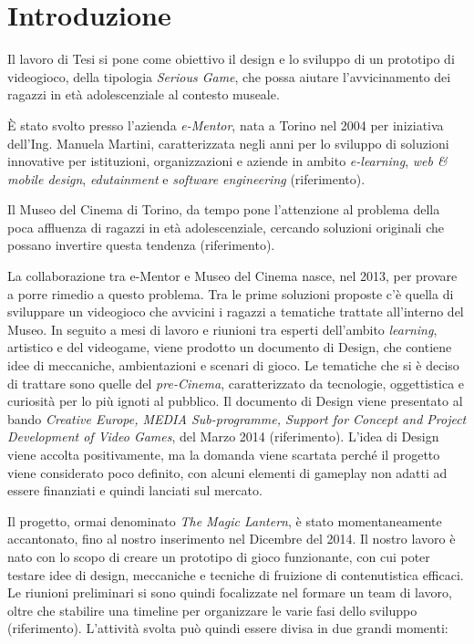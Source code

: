 \chapter{Introduzione}
\label{chap:intro}

Il lavoro di Tesi si pone come obiettivo il design e lo sviluppo di un prototipo di videogioco, della tipologia \textit{Serious Game}, che possa aiutare l’avvicinamento dei ragazzi in età adolescenziale al contesto museale.

È stato svolto presso l’azienda \textit{e-Mentor}, nata a Torino nel 2004 per iniziativa dell’Ing. Manuela Martini, caratterizzata negli anni per lo sviluppo di soluzioni innovative per istituzioni, organizzazioni e aziende in ambito \textit{e-learning}, \textit{web \& mobile design}, \textit{edutainment} e \textit{software engineering} (riferimento).

Il Museo del Cinema di Torino, da tempo pone l’attenzione al problema della poca affluenza di ragazzi in età adolescenziale, cercando soluzioni originali che possano invertire questa tendenza (riferimento).

La collaborazione tra e-Mentor e Museo del Cinema nasce, nel 2013, per provare a porre rimedio a questo problema.
Tra le prime soluzioni proposte c’è quella di sviluppare un videogioco che avvicini i ragazzi a tematiche trattate all’interno del Museo. In seguito a mesi di lavoro e riunioni tra esperti dell’ambito \textit{learning}, artistico e del videogame, viene prodotto un documento di Design, che contiene idee di meccaniche, ambientazioni e scenari di gioco. Le tematiche che si è deciso di trattare sono quelle del \textit{pre-Cinema}, caratterizzato da tecnologie, oggettistica e curiosità per lo più ignoti al pubblico.
Il documento di Design viene presentato al bando \textit{Creative Europe, MEDIA Sub-programme, Support for Concept and Project Development of Video Games}, del Marzo 2014 (riferimento).
L’idea di Design viene accolta positivamente, ma la domanda viene scartata perché il progetto viene considerato poco definito, con alcuni elementi di gameplay non adatti ad essere finanziati e quindi lanciati sul mercato.

Il progetto, ormai denominato \textit{The Magic Lantern}, è stato momentaneamente accantonato, fino al nostro inserimento nel Dicembre del 2014.
Il nostro lavoro è nato con lo scopo di creare un prototipo di gioco funzionante, con cui poter testare idee di design, meccaniche e tecniche di fruizione di contenutistica efficaci.
Le riunioni preliminari si sono quindi focalizzate nel formare un team di lavoro, oltre che stabilire una timeline per organizzare le varie fasi dello sviluppo (riferimento).
L’attività svolta può quindi essere divisa in due grandi momenti:

